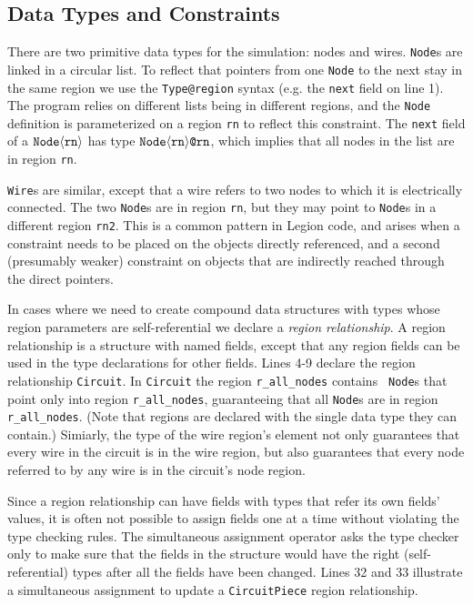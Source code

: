 \subsection{Data Types and Constraints}
\label{subsec:datatypes}
There are two primitive data types for the simulation: nodes
and wires.  {\tt Node}s are linked in a circular list.
To reflect that pointers from one {\tt Node} to the next stay
in the same region we use the {\tt Type@region} syntax (e.g.
the {\tt next} field on line 1).
The program relies on different lists being in different
regions, and the {\tt Node} definition is parameterized on a region
{\tt rn} to reflect this constraint.  
The {\tt next} field of a $\tt Node \langle rn \rangle$ has
type $\tt Node \langle rn \rangle \mbox{\tt @} rn$, which implies that
all nodes in the list are in region {\tt rn}.

{\tt Wire}s are similar, except that a wire refers to two nodes to
which it is electrically connected.  The two {\tt Node}s are in region {\tt rn},
but they may point to {\tt Node}s in a different region {\tt rn2}.  
This is a common pattern in Legion code, and
arises when a constraint needs to be placed on the objects directly
referenced, and a second (presumably weaker) constraint on objects
that are indirectly reached through the direct pointers.

In cases where we need to create compound data structures with types whose
region parameters are self-referential we declare a {\em region relationship}.
A region relationship is a structure with named fields, 
except that any region fields can be used in the type declarations
for other fields.  Lines 4-9 declare the region relationship {\tt Circuit}.
In {\tt Circuit} the region {\tt r\_all\_nodes} contains {\tt
Node}s that point only into region {\tt r\_all\_nodes}, guaranteeing that
all {\tt Node}s are in region {\tt r\_all\_nodes}.  (Note that regions are
declared with the single data type they can contain.)  Simiarly, the
type of the wire region's element not only guarantees that every wire
in the circuit is in the wire region, but also guarantees that every
node referred to by any wire is in the circuit's node region.

Since a region relationship can have
fields with types that refer its own fields' values, it is often not possible
to assign fields one at a time without violating the type checking rules.
The simultaneous assignment operator asks the type checker only to make sure
that the fields in the structure would have the right (self-referential) types
after all the fields have been changed.  Lines 32 and 33 illustrate a simultaneous
assignment to update a {\tt CircuitPiece} region relationship.

